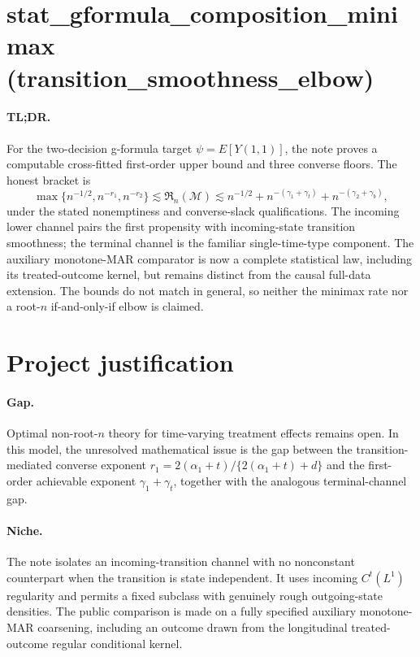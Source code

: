 \documentclass{article}
\begin{document}
\section*{stat\_\allowbreak{}gformula\_\allowbreak{}composition\_\allowbreak{}minimax (transition\_\allowbreak{}smoothness\_\allowbreak{}elbow)}

\paragraph{TL;DR.} For the two-decision g-formula target \(\psi=E[Y(1,1)]\), the note proves a computable cross-fitted first-order upper bound and three converse floors. The honest bracket is
\[
\max\{n^{-1/2},n^{-r_1},n^{-r_2}\}\lesssim\mathfrak R_n(\mathcal M)\lesssim n^{-1/2}+n^{-(\gamma_1+\gamma_t)}+n^{-(\gamma_2+\gamma_b)},
\]
under the stated nonemptiness and converse-slack qualifications. The incoming lower channel pairs the first propensity with incoming-state transition smoothness; the terminal channel is the familiar single-time-type component. The auxiliary monotone-MAR comparator is now a complete statistical law, including its treated-outcome kernel, but remains distinct from the causal full-data extension. The bounds do not match in general, so neither the minimax rate nor a root-\(n\) if-and-only-if elbow is claimed.

\section{Project justification}

\paragraph{Gap.} Optimal non-root-\(n\) theory for time-varying treatment effects remains open. In this model, the unresolved mathematical issue is the gap between the transition-mediated converse exponent \(r_1=2(\alpha_1+t)/\{2(\alpha_1+t)+d\}\) and the first-order achievable exponent \(\gamma_1+\gamma_t\), together with the analogous terminal-channel gap.

\paragraph{Niche.} The note isolates an incoming-transition channel with no nonconstant counterpart when the transition is state independent. It uses incoming \(C^t(L^1)\) regularity and permits a fixed subclass with genuinely rough outgoing-state densities. The public comparison is made on a fully specified auxiliary monotone-MAR coarsening, including an outcome drawn from the longitudinal treated-outcome regular conditional kernel.
\end{document}
